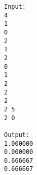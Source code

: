 \begin{verbatim}
Input:
4
1
0
2
1
2
0
1
2
2
2
2 5
2 0

Output:
1.000000
0.000000
0.666667
0.666667
\end{verbatim}